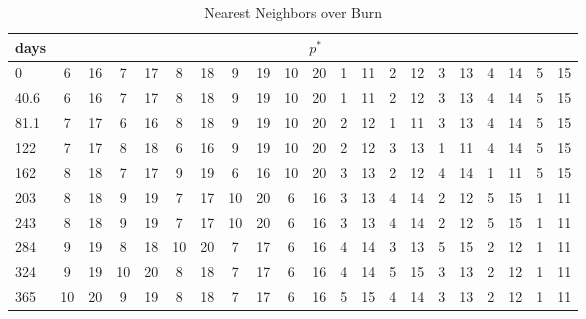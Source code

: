 \begin{table}[htbp]
\begin{center}
\caption{Nearest Neighbors over Burn}
\label{nn_table}
\tiny
\begin{tabular}{|l||cccccccccccccccccccc|}
\hline
\textbf{days} & \multicolumn{20}{|c|}{\textbf{$p^*$}} \\
\hline
0 & 6 & 16 & 7 & 17 & 8 & 18 & 9 & 19 & 10 & 20 & 1 & 11 & 2 & 12 & 3 & 13 & 4 & 14 & 5 & 15 \\
40.6 & 6 & 16 & 7 & 17 & 8 & 18 & 9 & 19 & 10 & 20 & 1 & 11 & 2 & 12 & 3 & 13 & 4 & 14 & 5 & 15 \\
81.1 & 7 & 17 & 6 & 16 & 8 & 18 & 9 & 19 & 10 & 20 & 2 & 12 & 1 & 11 & 3 & 13 & 4 & 14 & 5 & 15 \\
122 & 7 & 17 & 8 & 18 & 6 & 16 & 9 & 19 & 10 & 20 & 2 & 12 & 3 & 13 & 1 & 11 & 4 & 14 & 5 & 15 \\
162 & 8 & 18 & 7 & 17 & 9 & 19 & 6 & 16 & 10 & 20 & 3 & 13 & 2 & 12 & 4 & 14 & 1 & 11 & 5 & 15 \\
203 & 8 & 18 & 9 & 19 & 7 & 17 & 10 & 20 & 6 & 16 & 3 & 13 & 4 & 14 & 2 & 12 & 5 & 15 & 1 & 11 \\
243 & 8 & 18 & 9 & 19 & 7 & 17 & 10 & 20 & 6 & 16 & 3 & 13 & 4 & 14 & 2 & 12 & 5 & 15 & 1 & 11 \\
284 & 9 & 19 & 8 & 18 & 10 & 20 & 7 & 17 & 6 & 16 & 4 & 14 & 3 & 13 & 5 & 15 & 2 & 12 & 1 & 11 \\
324 & 9 & 19 & 10 & 20 & 8 & 18 & 7 & 17 & 6 & 16 & 4 & 14 & 5 & 15 & 3 & 13 & 2 & 12 & 1 & 11 \\
365 & 10 & 20 & 9 & 19 & 8 & 18 & 7 & 17 & 6 & 16 & 5 & 15 & 4 & 14 & 3 & 13 & 2 & 12 & 1 & 11 \\
\hline
\end{tabular}
\end{center}
\end{table}
